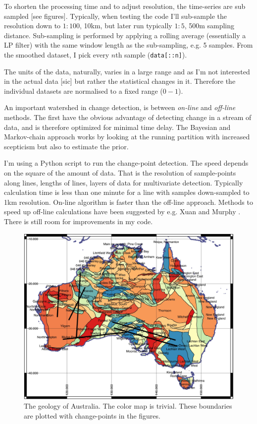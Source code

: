 To shorten the processing time and to adjust resolution, the time-series are sub sampled [see figures]. Typically, when testing the code I'll sub-sample the resolution down to $1:100$, 10km, but later run typically $1:5$, 500m sampling distance. Sub-sampling is performed by applying a rolling average (essentially a LP filter) with the same window length as the sub-sampling, e.g. 5 samples. From the smoothed dataset, I pick every $n$th sample (\texttt{data[::n]}). 

The units of the data, naturally, varies in a large range and as I'm not interested in the actual data [sic] but rather the statistical changes in it. Therefore the individual datasets are normalised to a fixed range ($0-1$). 

An important watershed in change detection, is between \textit{on-line } and  \textit{off-line} methods. The first have the obvious advantage of detecting change in a stream of data, and is therefore optimized for minimal time delay. The Bayesian and Markov-chain approach works by looking at the running partition with increased scepticism but also to estimate the prior. 

I'm using a Python script to run the change-point detection. The speed depends on the square of the amount of data. That is the resolution of sample-points along lines, lengths of lines, layers of data for multivariate detection. Typically calculation time is less than one minute for a line with samples down-sampled to 1km resolution. On-line algorithm is faster than the off-line approach. Methods to speed up off-line calculations have been suggested by e.g. Xuan and Murphy \cite{Xuan2007}. There is still room for improvements in my code. 


\begin{figure}[h]
	\centering
	\includegraphics[width=1\linewidth]{../fig/maps/aus_geo}
	\caption[Australian geology]{The geology of Australia. The color map is trivial. These boundaries are plotted with change-points in the figures.}
	\label{fig:aus_geo}
\end{figure}



